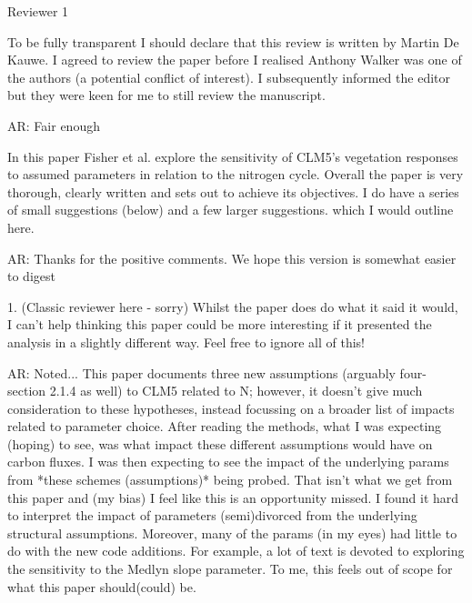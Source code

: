 \documentclass{article}
\begin{document}
\textsf{Reviewer 1}

To be fully transparent I should declare that this review is written by Martin De Kauwe. I agreed to review the paper before I realised Anthony Walker was one of the authors (a potential conflict of interest). I subsequently informed the editor but they were keen for me to still review the manuscript. 

\textsf{AR: Fair enough}

In this paper Fisher et al. explore the sensitivity of CLM5's vegetation responses to assumed parameters in relation to the nitrogen cycle. Overall the paper is very thorough, clearly written and sets out to achieve its objectives. I do have a series of small suggestions (below) and a few larger suggestions. which I would outline here. 

\textsf{AR: Thanks for the positive comments. We hope this version is somewhat easier to digest}

1. (Classic reviewer here - sorry) Whilst the paper does do what it said it would, I can't help thinking this paper could be more interesting if it presented the analysis in a slightly different way. Feel free to ignore all of this! 

\textsf{AR: Noted...}
This paper documents three new assumptions (arguably four- section 2.1.4 as well) to CLM5 related to N; however, it doesn't give much consideration to these hypotheses, instead focussing on a broader list of impacts related to parameter choice. After reading the methods, what I was expecting (hoping) to see, was what impact these different assumptions would have on carbon fluxes. I was then expecting to see the impact of the underlying params from *these schemes (assumptions)* being probed. That isn't what we get from this paper and (my bias) I feel like this is an opportunity missed. I found it hard to interpret the impact of parameters (semi)divorced from the underlying structural assumptions. Moreover, many of the params (in my eyes) had little to do with the new code additions. For example, a lot of text is devoted to exploring the sensitivity to the Medlyn slope parameter. To me, this feels out of scope for what this paper should(could) be. 
\end{document}
